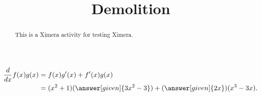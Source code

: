 \documentclass{ximera}
\title{Demolition}
\newcommand{\ddx}{\frac{d}{dx}}
\begin{document}

\begin{abstract} %
  This is a Ximera activity for testing Ximera.
\end{abstract}
\maketitle

\begin{align*}
\ddx f(x)g(x) &= f(x)g'(x) + f'(x)g(x)\\
&=(x^2+1)(\answer[given]{3x^2-3}) + (\answer[given]{2x})(x^3-3x).
\end{align*}

\end{document}
